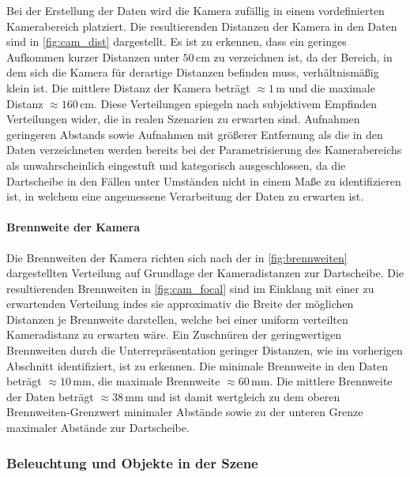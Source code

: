 Bei der Erstellung der Daten wird die Kamera zufällig in einem vordefinierten Kamerabereich platziert. Die resultierenden Distanzen der Kamera in den Daten sind in \autoref{fig:cam_dist} dargestellt. Es ist zu erkennen, dass ein geringes Aufkommen kurzer Distanzen unter $50\,\text{cm}$ zu verzeichnen ist, da der Bereich, in dem sich die Kamera für derartige Distanzen befinden muss, verhältnismäßig klein ist. Die mittlere Distanz der Kamera beträgt $\approx1\,\text{m}$ und die maximale Distanz $\approx160\,\text{cm}$. Diese Verteilungen spiegeln nach subjektivem Empfinden Verteilungen wider, die in realen Szenarien zu erwarten sind. Aufnahmen geringeren Abstands sowie Aufnahmen mit größerer Entfernung als die in den Daten verzeichneten werden bereits bei der Parametrisierung des Kamerabereichs als unwahrscheinlich eingestuft und kategorisch ausgeschlossen, da die Dartscheibe in den Fällen unter Umständen nicht in einem Maße zu identifizieren ist, in welchem eine angemessene Verarbeitung der Daten zu erwarten ist.

\paragraph{Brennweite der Kamera}

Die Brennweiten der Kamera richten sich nach der in \autoref{fig:brennweiten} dargestellten Verteilung auf Grundlage der Kameradistanzen zur Dartscheibe. Die resultierenden Brennweiten in \autoref{fig:cam_focal} sind im Einklang mit einer zu erwartenden Verteilung indes sie approximativ die Breite der möglichen Distanzen je Brennweite darstellen, welche bei einer uniform verteilten Kameradistanz zu erwarten wäre. Ein Zuschnüren der geringwertigen Brennweiten durch die Unterrepräsentation geringer Distanzen, wie im vorherigen Abschnitt identifiziert, ist zu erkennen. Die minimale Brennweite in den Daten beträgt $\approx10\,\text{mm}$, die maximale Brennweite $\approx60\,\text{mm}$. Die mittlere Brennweite der Daten beträgt $\approx38\,\text{mm}$ und ist damit wertgleich zu dem oberen Brennweiten-Grenzwert minimaler Abstände sowie zu der unteren Grenze maximaler Abstände zur Dartscheibe.

\subsubsection{Beleuchtung und Objekte in der Szene}
\label{sec:beleuchtung_ergebnisse}

